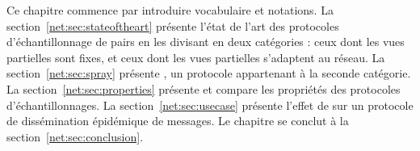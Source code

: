 Ce chapitre commence par introduire vocabulaire et notations. La
section~\ref{net:sec:stateoftheart} présente l'état de l'art des protocoles
d'échantillonnage de pairs en les divisant en deux catégories : ceux dont les
vues partielles sont fixes, et ceux dont les vues partielles s'adaptent au
réseau. La section~\ref{net:sec:spray} présente \SPRAY, un protocole appartenant
à la seconde catégorie. La section~\ref{net:sec:properties} présente et compare
les propriétés des protocoles d'échantillonnages. La
section~\ref{net:sec:usecase} présente l'effet de \SPRAY sur un protocole de
dissémination épidémique de messages. Le chapitre se conclut à la
section~\ref{net:sec:conclusion}.

